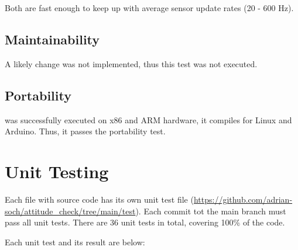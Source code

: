 \documentclass[12pt, titlepage]{article}
\begin{document}
Both are fast enough to keep up with average sensor update rates (20 - 600 Hz).

\subsection{Maintainability}

A likely change was not implemented, thus this test was not executed.

\subsection{Portability}

\progname{} was successfully executed on x86 and ARM hardware, it compiles for Linux and Arduino.
Thus, it passes the portability test.

\section{Unit Testing}

Each file with source code has its own unit test file
(\url{https://github.com/adrian-soch/attitude_check/tree/main/test}). Each commit tot the main branch must pass all unit tests. There are 36 unit tests in total, covering 100\% of the code.

Each unit test and its result are below:
\end{document}
